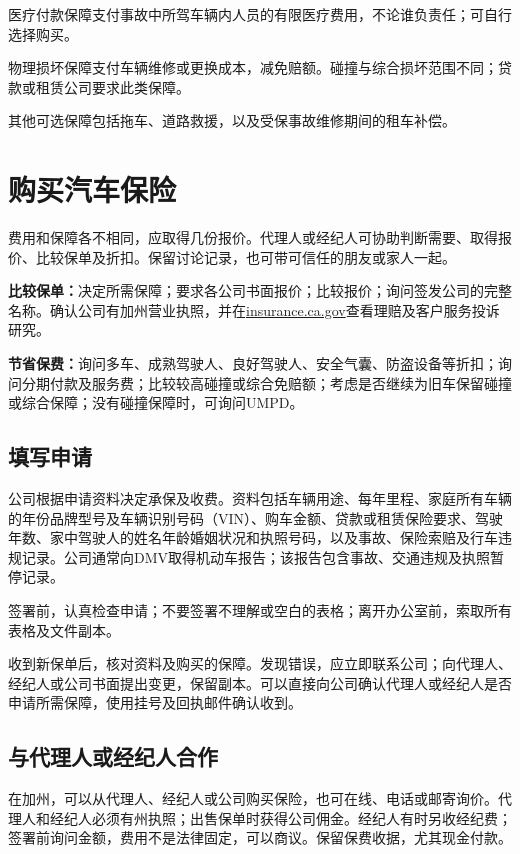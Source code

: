 \documentclass[UTF8,fontset=none,11pt,a4paper]{ctexart}
\begin{document}
医疗付款保障支付事故中所驾车辆内人员的有限医疗费用，不论谁负责任；可自行\allowbreak\mbox{选择购买。}


物理损坏保障支付车辆维修或更换成本，减免赔额。碰撞与综合损坏范围不同；贷款或租赁公司要求\allowbreak\mbox{此类保障。}


其他可选保障包括拖车、道路救援，以及受保事故维修期间的\allowbreak\mbox{租车补偿。}


\section*{购买汽车保险}
费用和保障各不相同，应取得几份报价。代理人或经纪人可协助判断需要、取得报价、比较保单及折扣。保留讨论记录，也可带可信任的朋友或\allowbreak\mbox{家人一起。}


\textbf{比较保单：}决定所需保障；要求各公司书面报价；比较报价；询问签发公司的完整名称。确认公司有加州营业执照，并在\url{insurance.ca.gov}查看理赔及客户服务\allowbreak\mbox{投诉研究。}


\textbf{节省保费：}询问多车、成熟驾驶人、良好驾驶人、安全气囊、防盗设备等折扣；询问分期付款及服务费；比较较高碰撞或综合免赔额；考虑是否继续为旧车保留碰撞或综合保障；没有碰撞保障时，可询问UMPD。


\subsection*{填写申请}
公司根据申请资料决定承保及收费。资料包括车辆用途、每年里程、家庭所有车辆的年份品牌型号及车辆识别号码（VIN）、购车金额、贷款或租赁保险要求、驾驶年数、家中驾驶人的姓名年龄婚姻状况和执照号码，以及事故、保险索赔及行车违规记录。公司通常向DMV取得机动车报告；该报告包含事故、交通违规及执照暂\allowbreak\mbox{停记录。}


签署前，认真检查申请；不要签署不理解或空白的表格；离开办公室前，索取所有表格及\allowbreak\mbox{文件副本。}


收到新保单后，核对资料及购买的保障。发现错误，应立即联系公司；向代理人、经纪人或公司书面提出变更，保留副本。可以直接向公司确认代理人或经纪人是否申请所需保障，使用挂号及回执邮件\allowbreak\mbox{确认收到。}


\subsection*{与代理人或经纪人合作}
在加州，可以从代理人、经纪人或公司购买保险，也可在线、电话或邮寄询价。代理人和经纪人必须有州执照；出售保单时获得公司佣金。经纪人有时另收经纪费；签署前询问金额，费用不是法律固定，可以商议。保留保费收据，尤其\allowbreak\mbox{现金付款。}
\end{document}
